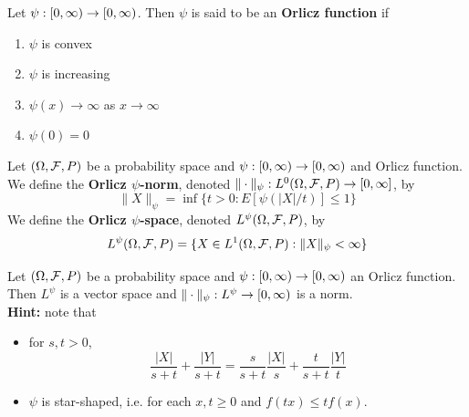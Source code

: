 \documentclass{book}
\begin{document}
	\begin{defn}
		Let $\psi: [0,\infty) \rightarrow [0,\infty)$. Then $\psi$ is said to be an \textbf{Orlicz function} if 
		\begin{enumerate}
			\item $\psi$ is convex
			\item $\psi$ is increasing
			\item $\psi(x) \rightarrow \infty$ as $x \rightarrow \infty$
			\item $\psi(0) = 0$
		\end{enumerate}
	\end{defn}

	\begin{defn}
		Let $(\Omega, \mathcal{F}, P)$ be a probability space and $\psi: [0,\infty) \rightarrow [0,\infty)$ and Orlicz function. We define the \textbf{Orlicz $\psi$-norm}, denoted $\|\cdot\|_{\psi}: L^0(\Omega, \mathcal{F}, P) \rightarrow [0,\infty]$, by 
		$$\|X\|_{\psi} = \inf \{t >0: E [\psi(|X|/t)] \leq 1\}$$
		We define the \textbf{Orlicz $\psi$-space}, denoted $L^{\psi}(\Omega, \mathcal{F}, P)$, by 
		$$L^{\psi}(\Omega, \mathcal{F}, P) = \{X \in L^1(\Omega, \mathcal{F}, P): \|X\|_{\psi} < \infty\}$$
	\end{defn}

	\begin{ex}
		Let $(\Omega, \mathcal{F}, P)$ be a probability space and $\psi: [0,\infty) \rightarrow [0,\infty)$ an Orlicz function. Then $L^{\psi}$ is a vector space and $\|\cdot\|_{\psi}:L^{\psi} \rightarrow [0,\infty)$ is a norm.\\
		\textbf{Hint:} note that
		\begin{itemize}
			\item for $s,t > 0$,
			$$\frac{|X|}{s + t} + \frac{|Y|}{s + t} = \frac{s}{s + t}\frac{|X|}{s} + \frac{t}{s + t}\frac{|Y|}{t}$$
			\item $\psi$ is star-shaped, i.e. for each $x, t \geq 0$ and $f(tx) \leq tf(x)$.
		\end{itemize}
	\end{ex}
\end{document}
